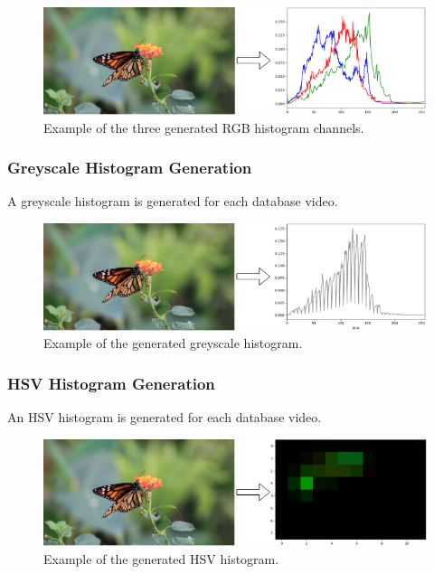 \begin{figure}[h] 
\centerline{\includegraphics[width=\textwidth]{figures/implementation/rgb_histogram_generation.png}}
\caption{\label{fig:implementation-rgb_histogram_generation}Example of the three generated RGB histogram channels.}
\end{figure}

\subsubsection{Greyscale Histogram Generation}

A greyscale histogram is generated for each database video. 

\begin{figure}[h] 
\centerline{\includegraphics[width=\textwidth]{figures/implementation/greycale_histogram_generation.png}}
\caption{\label{fig:greycale_histogram_generation}Example of the generated greyscale histogram.}
\end{figure}

\subsubsection{HSV Histogram Generation}

An HSV histogram is generated for each database video. 

\begin{figure}[h] 
\centerline{\includegraphics[width=\textwidth]{figures/implementation/hsv_histogram_generation.png}}
\caption{\label{fig:hsv_histogram_generation}Example of the generated HSV histogram.}
\end{figure}

